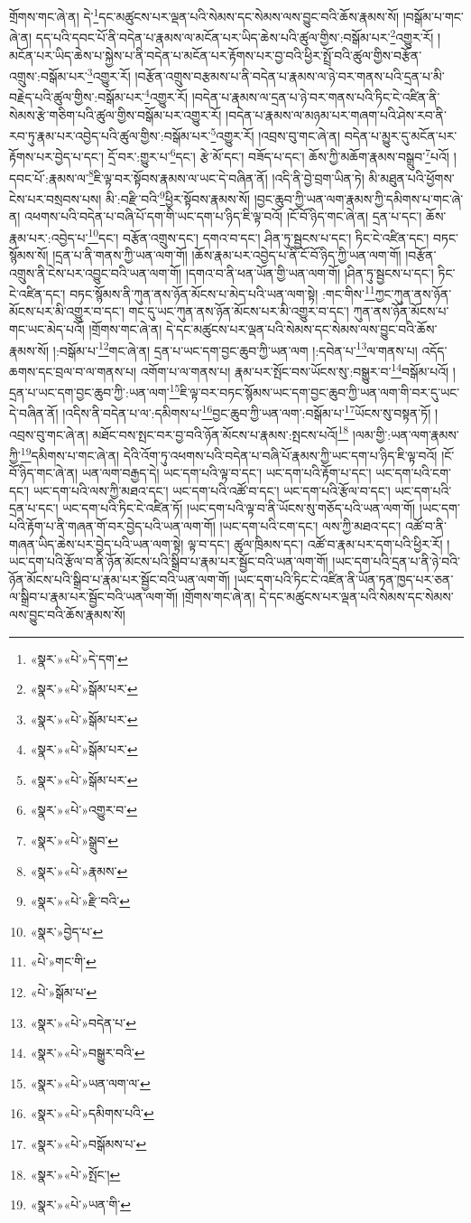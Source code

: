 གྲོགས་གང་ཞེ་ན། དེ་\footnote{«སྣར་»«པེ་»དེ་དག་}དང་མཚུངས་པར་ལྡན་པའི་སེམས་དང་སེམས་ལས་བྱུང་བའི་ཆོས་རྣམས་སོ། །བསྒོམ་པ་གང་ཞེ་ན། དད་པའི་དབང་པོ་ནི་བདེན་པ་རྣམས་ལ་མངོན་པར་ཡིད་ཆེས་པའི་ཚུལ་གྱིས་:བསྒོམ་པར་\footnote{«སྣར་»«པེ་»སྒོམ་པར་}འགྱུར་རོ། །མངོན་པར་ཡིད་ཆེས་པ་སྐྱེས་པ་ནི་བདེན་པ་མངོན་པར་རྟོགས་པར་བྱ་བའི་ཕྱིར་སྤྲོ་བའི་ཚུལ་གྱིས་བརྩོན་འགྲུས་:བསྒོམ་པར་\footnote{«སྣར་»«པེ་»སྒོམ་པར་}འགྱུར་རོ། །བརྩོན་འགྲུས་བརྩམས་པ་ནི་བདེན་པ་རྣམས་ལ་ཉེ་བར་གནས་པའི་དྲན་པ་མི་བརྗེད་པའི་ཚུལ་གྱིས་:བསྒོམ་པར་\footnote{«སྣར་»«པེ་»སྒོམ་པར་}འགྱུར་རོ། །བདེན་པ་རྣམས་ལ་དྲན་པ་ཉེ་བར་གནས་པའི་ཏིང་ངེ་འཛིན་ནི་སེམས་རྩེ་གཅིག་པའི་ཚུལ་གྱིས་བསྒོམ་པར་འགྱུར་རོ། །བདེན་པ་རྣམས་ལ་མཉམ་པར་གཞག་པའི་ཤེས་རབ་ནི་རབ་ཏུ་རྣམ་པར་འབྱེད་པའི་ཚུལ་གྱིས་:བསྒོམ་པར་\footnote{«སྣར་»«པེ་»སྒོམ་པར་}འགྱུར་རོ། །འབྲས་བུ་གང་ཞེ་ན། བདེན་པ་མྱུར་དུ་མངོན་པར་རྟོགས་པར་བྱེད་པ་དང་། དྲོ་བར་:གྱུར་པ་\footnote{«སྣར་»«པེ་»འགྱུར་བ་}དང་། རྩེ་མོ་དང་། བཟོད་པ་དང་། ཆོས་ཀྱི་མཆོག་རྣམས་བསྒྲུབ་\footnote{«སྣར་»«པེ་»སྒྲུབ་}པའོ། །དབང་པོ་:རྣམས་ལ་\footnote{«སྣར་»«པེ་»རྣམས་}ཇི་ལྟ་བར་སྟོབས་རྣམས་ལ་ཡང་དེ་བཞིན་ནོ། །འདི་ནི་བྱེ་བྲག་ཡིན་ཏེ། མི་མཐུན་པའི་ཕྱོགས་ངེས་པར་བསྲབས་པས། མི་:བརྫི་བའི་\footnote{«སྣར་»«པེ་»རྫི་བའི་}ཕྱིར་སྟོབས་རྣམས་སོ། །བྱང་ཆུབ་ཀྱི་ཡན་ལག་རྣམས་ཀྱི་དམིགས་པ་གང་ཞེ་ན། འཕགས་པའི་བདེན་པ་བཞི་པོ་དག་གི་ཡང་དག་པ་ཉིད་ཇི་ལྟ་བའོ། །ངོ་བོ་ཉིད་གང་ཞེ་ན། དྲན་པ་དང་། ཆོས་རྣམ་པར་:འབྱེད་པ་\footnote{«སྣར་»བྱེད་པ་}དང་། བརྩོན་འགྲུས་དང་། དགའ་བ་དང་། ཤིན་ཏུ་སྦྱངས་པ་དང་། ཏིང་ངེ་འཛིན་དང་། བཏང་སྙོམས་སོ། །དྲན་པ་ནི་གནས་ཀྱི་ཡན་ལག་གོ། །ཆོས་རྣམ་པར་འབྱེད་པ་ནི་ངོ་བོ་ཉིད་ཀྱི་ཡན་ལག་གོ། །བརྩོན་འགྲུས་ནི་ངེས་པར་འབྱུང་བའི་ཡན་ལག་གོ། །དགའ་བ་ནི་ཕན་ཡོན་གྱི་ཡན་ལག་གོ། །ཤིན་ཏུ་སྦྱངས་པ་དང་། ཏིང་ངེ་འཛིན་དང་། བཏང་སྙོམས་ནི་ཀུན་ནས་ཉོན་མོངས་པ་མེད་པའི་ཡན་ལག་སྟེ། :གང་གིས་\footnote{«པེ་»གང་གི་}ཀྱང་ཀུན་ནས་ཉོན་མོངས་པར་མི་འགྱུར་བ་དང་། གང་དུ་ཡང་ཀུན་ནས་ཉོན་མོངས་པར་མི་འགྱུར་བ་དང་། ཀུན་ནས་ཉོན་མོངས་པ་གང་ཡང་མེད་པའོ། །གྲོགས་གང་ཞེ་ན། དེ་དང་མཚུངས་པར་ལྡན་པའི་སེམས་དང་སེམས་ལས་བྱུང་བའི་ཆོས་རྣམས་སོ། །:བསྒོམ་པ་\footnote{«པེ་»སྒོམ་པ་}གང་ཞེ་ན། དྲན་པ་ཡང་དག་བྱང་ཆུབ་ཀྱི་ཡན་ལག །:དབེན་པ་\footnote{«སྣར་»«པེ་»བདེན་པ་}ལ་གནས་པ། འདོད་ཆགས་དང་བྲལ་བ་ལ་གནས་པ། འགོག་པ་ལ་གནས་པ། རྣམ་པར་སྤོང་བས་ཡོངས་སུ་:བསྒྱུར་བ་\footnote{«སྣར་»«པེ་»བསྒྱུར་བའི་}བསྒོམ་པའོ། །དྲན་པ་ཡང་དག་བྱང་ཆུབ་ཀྱི་:ཡན་ལག་\footnote{«སྣར་»«པེ་»ཡན་ལག་ལ་}ཇི་ལྟ་བར་བཏང་སྙོམས་ཡང་དག་བྱང་ཆུབ་ཀྱི་ཡན་ལག་གི་བར་དུ་ཡང་དེ་བཞིན་ནོ། །འདིས་ནི་བདེན་པ་ལ་:དམིགས་པ་\footnote{«སྣར་»«པེ་»དམིགས་པའི་}བྱང་ཆུབ་ཀྱི་ཡན་ལག་:བསྒོམ་པ་\footnote{«སྣར་»«པེ་»བསྒོམས་པ་}ཡོངས་སུ་བསྟན་ཏོ། །འབྲས་བུ་གང་ཞེ་ན། མཐོང་བས་སྤང་བར་བྱ་བའི་ཉོན་མོངས་པ་རྣམས་:སྤངས་པའོ།\footnote{«སྣར་»«པེ་»སྤོང་།} །ལམ་གྱི་:ཡན་ལག་རྣམས་ཀྱི་\footnote{«སྣར་»«པེ་»ཡན་གི་}དམིགས་པ་གང་ཞེ་ན། དེའི་འོག་ཏུ་འཕགས་པའི་བདེན་པ་བཞི་པོ་རྣམས་ཀྱི་ཡང་དག་པ་ཉིད་ཇི་ལྟ་བའོ། །ངོ་བོ་ཉིད་གང་ཞེ་ན། ཡན་ལག་བརྒྱད་དེ། ཡང་དག་པའི་ལྟ་བ་དང་། ཡང་དག་པའི་རྟོག་པ་དང་། ཡང་དག་པའི་ངག་དང་། ཡང་དག་པའི་ལས་ཀྱི་མཐའ་དང་། ཡང་དག་པའི་འཚོ་བ་དང་། ཡང་དག་པའི་རྩོལ་བ་དང་། ཡང་དག་པའི་དྲན་པ་དང་། ཡང་དག་པའི་ཏིང་ངེ་འཛིན་ཏོ། །ཡང་དག་པའི་ལྟ་བ་ནི་ཡོངས་སུ་གཅོད་པའི་ཡན་ལག་གོ། །ཡང་དག་པའི་རྟོག་པ་ནི་གཞན་གོ་བར་བྱེད་པའི་ཡན་ལག་གོ། །ཡང་དག་པའི་ངག་དང་། ལས་ཀྱི་མཐའ་དང་། འཚོ་བ་ནི་གཞན་ཡིད་ཆེས་པར་བྱེད་པའི་ཡན་ལག་སྟེ། ལྟ་བ་དང་། ཚུལ་ཁྲིམས་དང་། འཚོ་བ་རྣམ་པར་དག་པའི་ཕྱིར་རོ། །ཡང་དག་པའི་རྩོལ་བ་ནི་ཉོན་མོངས་པའི་སྒྲིབ་པ་རྣམ་པར་སྦྱོང་བའི་ཡན་ལག་གོ། །ཡང་དག་པའི་དྲན་པ་ནི་ཉེ་བའི་ཉོན་མོངས་པའི་སྒྲིབ་པ་རྣམ་པར་སྦྱོང་བའི་ཡན་ལག་གོ། །ཡང་དག་པའི་ཏིང་ངེ་འཛིན་ནི་ཡོན་ཏན་ཁྱད་པར་ཅན་ལ་སྒྲིབ་པ་རྣམ་པར་སྦྱོང་བའི་ཡན་ལག་གོ། །གྲོགས་གང་ཞེ་ན། དེ་དང་མཚུངས་པར་ལྡན་པའི་སེམས་དང་སེམས་ལས་བྱུང་བའི་ཆོས་རྣམས་སོ། 